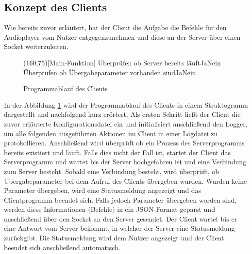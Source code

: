 \subsection{Konzept des Clients}
Wie bereits zuvor erläutert, hat der Client die Aufgabe die Befehle für den
Audioplayer vom Nutzer entgegenzunehmen und diese an der Server über einen
Socket weiterzuleiten.

\begin{figure}[H]
    \begin{struktogramm}(160,75)[Main-Funktion] 
         {Überprüfen ob Server bereits läuft}{Ja}{Nein} 
        	\change
        \ifend
         {Überprüfen ob Übergabeparameter vorhanden sind}{Ja}{Nein} 
            \whileend
            \change
        \ifend
    \end{struktogramm} 
\caption{Programmablauf des Clients} 
\label{lst:client_ablauf} 
\end{figure}

In der Abbildung \ref{lst:client_ablauf} wird der Programmablauf des Clients in
einem Struktogramm dargestellt und nachfolgend kurz erörtert. Als ersten Schritt ließt
der Client die zuvor erläuterte Konfigurationsdatei ein und initialisiert
anschließend den Logger, um alle folgenden ausgeführten Aktionen im Client in
einer Logdatei zu protokollieren. Anschließend wird überprüft ob ein Prozess
des Serverprogramms bereits existiert und läuft. Falls dies nicht der Fall ist,
startet der Client das Serverprogramm und wartet bis der Server hochgefahren
ist und eine Verbindung zum Server besteht. Sobald eine
Verbindung besteht, wird überprüft, ob Übergabeparameter bei dem Aufruf des
Clients übergeben wurden. Wurden keine Parameter übergeben, wird eine
Statusmeldung angezeigt und das Clientprogramm beendet sich. Falls jedoch
Parameter übergeben worden sind, werden diese Informationen (Befehle) in ein
\ac{JSON}-Format geparst und anschließend über den Socket an den Server
gesendet. Der Client wartet bis er eine Antwort vom Server bekommt, in welcher
der Server eine Statusmeldung zurückgibt.  Die Statusmeldung wird dem Nutzer
angezeigt und der Client beendet sich anschließend automatisch.

